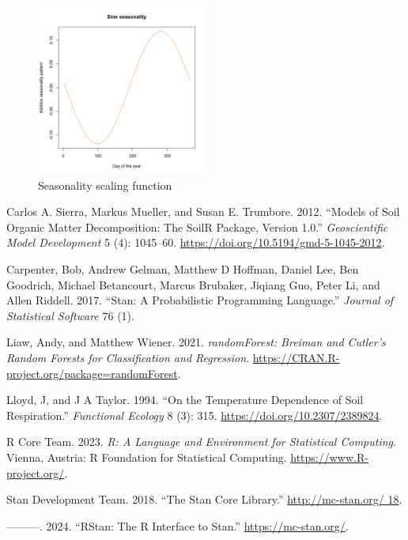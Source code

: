 \documentclass[
]{article}
\newlength{\cslhangindent}
\newenvironment{CSLReferences}[2] %
 {\begin{list}{}{%
  \setlength{\itemindent}{0pt}
  \setlength{\leftmargin}{0pt}
  \setlength{\parsep}{0pt}
  \ifodd #1
   \setlength{\leftmargin}{\cslhangindent}
   \setlength{\itemindent}{-1\cslhangindent}
  \fi
  \setlength{\itemsep}{#2\baselineskip}}}
 {\end{list}}
\begin{document}
\begin{figure}
\centering
\includegraphics[width=0.5\textwidth,height=\textheight]{../Figures/Season.png}
\caption{Seasonality scaling function}
\end{figure}

\label{refs}
\begin{CSLReferences}{1}{0}
Carlos A. Sierra, Markus Mueller, and Susan E. Trumbore. 2012. {``Models of Soil Organic Matter Decomposition: The SoilR Package, Version 1.0.''} \emph{Geoscientific Model Development} 5 (4): 1045--60. \url{https://doi.org/10.5194/gmd-5-1045-2012}.

Carpenter, Bob, Andrew Gelman, Matthew D Hoffman, Daniel Lee, Ben Goodrich, Michael Betancourt, Marcus Brubaker, Jiqiang Guo, Peter Li, and Allen Riddell. 2017. {``Stan: A Probabilistic Programming Language.''} \emph{Journal of Statistical Software} 76 (1).

Liaw, Andy, and Matthew Wiener. 2021. \emph{randomForest: Breiman and Cutler's Random Forests for Classification and Regression}. \url{https://CRAN.R-project.org/package=randomForest}.

Lloyd, J, and J A Taylor. 1994. {``{On the Temperature Dependence of Soil Respiration}.''} \emph{Functional Ecology} 8 (3): 315. \url{https://doi.org/10.2307/2389824}.

R Core Team. 2023. \emph{{R}: A Language and Environment for Statistical Computing}. Vienna, Austria: R Foundation for Statistical Computing. \url{https://www.R-project.org/}.

Stan Development Team. 2018. {``{The Stan Core Library}.''} \href{http://mc-stan.org/\%2018}{http://mc-stan.org/ 18}.

---------. 2024. {``{RStan}: The {R} Interface to {Stan}.''} \url{https://mc-stan.org/}.

\end{CSLReferences}
\end{document}
